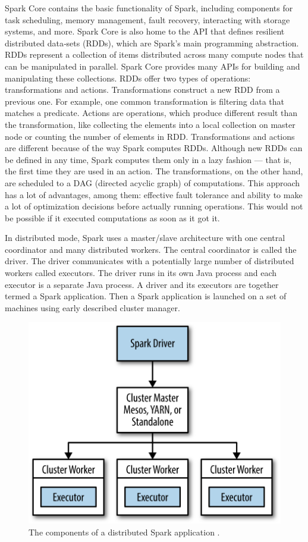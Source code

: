 Spark Core contains the basic functionality of Spark, including components for task scheduling, memory management, fault recovery, interacting with storage systems, and more. Spark Core is also home to the API that defines resilient distributed data‐sets (RDDs), which are Spark’s main programming abstraction. RDDs represent a collection of items distributed across many compute nodes that can be manipulated in parallel. Spark Core provides many APIs for building and manipulating these collections. RDDs offer two types of operations: transformations and actions. Transformations construct a new RDD from a previous one. For example, one common transformation is filtering data that matches a predicate. Actions are operations, which produce different result than the transformation, like collecting the elements into a local collection on master node or counting the number of elements in RDD. Transformations and actions are different because of the way Spark computes RDDs. Although new RDDs can be defined in any time, Spark computes them only in a lazy fashion — that is, the first time they are used in an action. The transformations, on the other hand, are scheduled to a DAG (directed acyclic graph) of computations. This approach has a lot of advantages, among them: effective fault tolerance and ability to make a lot of optimization decisions before actually running operations. This would not be possible if it executed computations as soon as it got it.

In distributed mode, Spark uses a master/slave architecture with one central coordinator and many distributed workers. The central coordinator is called the driver. The driver communicates with a potentially large number of distributed workers called executors. The driver runs in its own Java process and each executor is a separate Java process. A driver and its executors are together termed a Spark application. Then a Spark application is launched on a set of machines using early described cluster manager.

\begin{figure}
\centering\includegraphics[width=.6\textwidth]{img/spark-runtime-split}
\caption{ The components of a distributed Spark application \cite{learning_spark}.}  \label{img:spark-components}
\end{figure}


